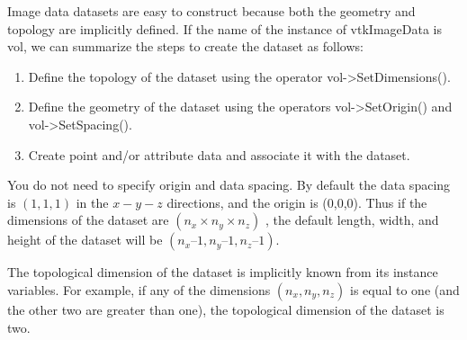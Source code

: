 Image data datasets are easy to construct because both the geometry and topology are implicitly defined. If the name of the instance of vtkImageData is vol, we can summarize the steps to create the dataset as follows:

\begin{enumerate}

	\item Define the topology of the dataset using the operator vol->SetDimensions().

	\item Define the geometry of the dataset using the operators vol->SetOrigin() and vol->SetSpacing().

	\item Create point and/or attribute data and associate it with the dataset.

\end{enumerate}

You do not need to specify origin and data spacing. By default the data spacing is $(1,1,1)$ in the $x-y-z$ directions, and the origin is (0,0,0). Thus if the dimensions of the dataset are $(n_x \times n_y \times n_z)$ , the default length, width, and height of the dataset will be $(n_x – 1, n_y – 1, n_z – 1)$.

The topological dimension of the dataset is implicitly known from its instance variables. For example, if any of the dimensions $(n_x, n_y, n_z)$ is equal to one (and the other two are greater than one), the topological dimension of the dataset is two.

